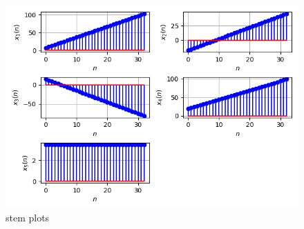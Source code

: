 \documentclass[journal,12pt,twocolumn]{IEEEtran}
\theoremstyle{remark}
\begin{document}
\begin{enumerate}
\begin{figure}[h!]
    \includegraphics[width=\columnwidth]{ncert-maths/10/5/2/1/figs/10.png}
    \caption{stem plots }
    \label{fig:ESFIG1}
\end{figure}
\end{enumerate}

\end{document}
